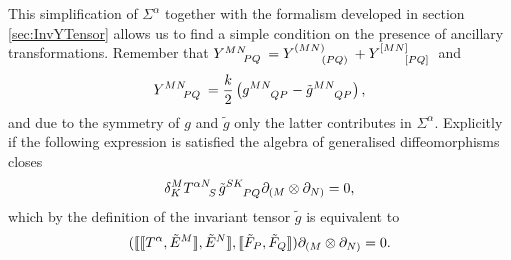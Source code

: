 This simplification of $\Sigma^\alpha$ together with the formalism developed in section \ref{sec:InvYTensor} allows us to find a simple condition on the presence of ancillary transformations. Remember that $\tensor{Y}{^{MN}_{PQ}}=\tensor{Y}{^{(MN)}_{(PQ)}}+\tensor{Y}{^{[MN]}_{[PQ]}}$ and 
\begin{equation}
    \tensor{Y}{^{MN}_{PQ}} = \frac{k}{2}\left(\tensor{g}{^{MN}_{QP}}-\tensor{\tilde{g}}{^{MN}_{QP}}\right),
\end{equation}
and due to the symmetry of $g$ and $\tilde{g}$ only the latter contributes in $\Sigma^\alpha$. Explicitly if the following expression is satisfied the algebra of generalised diffeomorphisms closes
\begin{equation}
    \delta^{M}_K\tensor{T}{^{\alpha N}_S}\tensor{\tilde{g}}{^{SK}_{PQ}}\pd_{(M}\otimes\pd_{N)} = 0,
\end{equation}
which by the definition of the invariant tensor $\tilde{g}$ is equivalent to 
\begin{equation}\label{eq:PrelAnc}
    (\llbracket \llbracket T^\alpha,\tilde{E}^{M}\rrbracket,\tilde{E}^N\rrbracket,\llbracket \tilde{F}_P,\tilde{F}_Q\rrbracket)\partial_{(M}\otimes\partial_{N)} = 0.
\end{equation}


